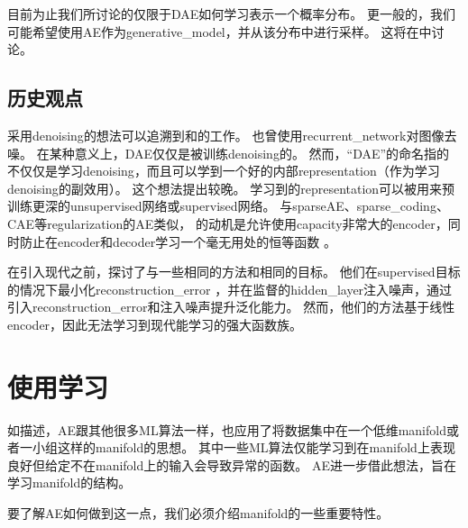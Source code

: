 
目前为止我们所讨论的仅限于\gls{DAE}如何学习表示一个概率分布。
更一般的，我们可能希望使用\gls{AE}作为\gls{generative_model}，并从该分布中进行采样。
这将在中讨论。


\subsection{历史观点}
\label{sec:historical_perspective_chap14}
采用\gls{denoising}的想法可以追溯到\cite{Lecun-these87}和\citet{Gallinari87}的工作。
\citet{Behnke-2001}也曾使用\gls{recurrent_network}对图像去噪。
在某种意义上，\gls{DAE}仅仅是被训练\gls{denoising}的。
然而，``\gls{DAE}''的命名指的不仅仅是学习\gls{denoising}，而且可以学到一个好的内部\gls{representation}（作为学习\gls{denoising}的副效用）。
这个想法提出较晚\citep{VincentPLarochelleH2008-small,Vincent-JMLR-2010-small}。
学习到的\gls{representation}可以被用来预训练更深的\gls{unsupervised}网络或\gls{supervised}网络。
与\gls{sparse}\gls{AE}、\gls{sparse_coding}、\gls{CAE}等\gls{regularization}的\gls{AE}类似， 的动机是允许使用\gls{capacity}非常大的\gls{encoder}，同时防止在\gls{encoder}和\gls{decoder}学习一个毫无用处的恒等函数 。


在引入现代之前，\citet{Inayoshi-and-Kurita-2005}探讨了与一些相同的方法和相同的目标。
他们在\gls{supervised}目标的情况下最小化\gls{reconstruction_error} ，并在监督的\gls{hidden_layer}注入噪声，通过引入\gls{reconstruction_error}和注入噪声提升泛化能力。
然而，他们的方法基于线性\gls{encoder}，因此无法学习到现代能学习的强大函数族。



\section{使用学习}
\label{sec:learning_manifolds_with_autoencoders}

如描述，\gls{AE}跟其他很多\gls{ML}算法一样，也应用了将数据集中在一个低维\gls{manifold}或者一小组这样的\gls{manifold}的思想。
其中一些\gls{ML}算法仅能学习到在\gls{manifold}上表现良好但给定不在\gls{manifold}上的输入会导致异常的函数。
\gls{AE}进一步借此想法，旨在学习\gls{manifold}的结构。


要了解\gls{AE}如何做到这一点，我们必须介绍\gls{manifold}的一些重要特性。


